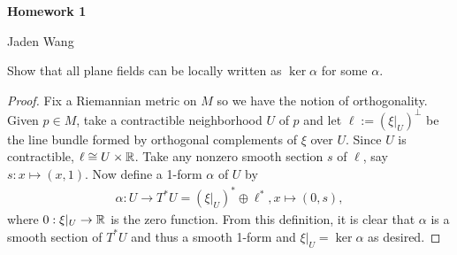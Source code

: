 \documentclass[12pt]{article}
\begin{document}
\centerline {\textsf{\textbf{\LARGE{Homework 1}}}}
\centerline {Jaden Wang}
\vspace{.15in}
\begin{problem}[1]
Show that all plane fields can be locally written as $ \ker \alpha$ for some $ \alpha$.

\begin{proof}
Fix a Riemannian metric on $ M$ so we have the notion of orthogonality. Given $ p \in M$, take a contractible neighborhood $ U$ of  $ p$ and let  $ \ell := (\xi|_U)^{\perp}$ be the line bundle formed by orthogonal complements of $ \xi$ over $ U$. Since $ U$ is contractible, $ \ell \cong U \times \mathbb{R}$. Take any nonzero smooth section $ s$ of $ \ell$, say $s: x \mapsto (x,1) $. Now define a 1-form $ \alpha$ of $ U$ by
\begin{align*}
	\alpha: U \to T^*U = (\xi|_U)^* \oplus \ell^*, x \mapsto (0,s),
\end{align*}
where $ 0: \xi|_U \to \mathbb{R}$ is the zero function. From this definition, it is clear that $ \alpha$ is a smooth section of $ T^* U$ and thus a smooth 1-form and $ \xi|_U = \ker \alpha$ as desired.
\end{proof}
\end{problem}
\end{document}
